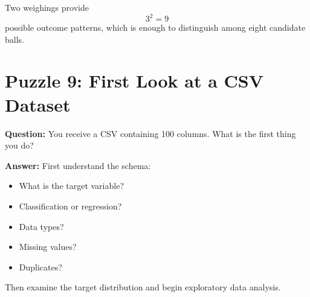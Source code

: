 \documentclass{article}
\begin{document}
Two weighings provide
\[
3^2=9
\]
possible outcome patterns, which is enough to distinguish among eight candidate balls.

\section*{Puzzle 9: First Look at a CSV Dataset}

\textbf{Question:}
You receive a CSV containing 100 columns.
What is the first thing you do?

\textbf{Answer:}
First understand the schema:
\begin{itemize}
    \item What is the target variable?
    \item Classification or regression?
    \item Data types?
    \item Missing values?
    \item Duplicates?
\end{itemize}

Then examine the target distribution and begin exploratory data analysis.
\end{document}
